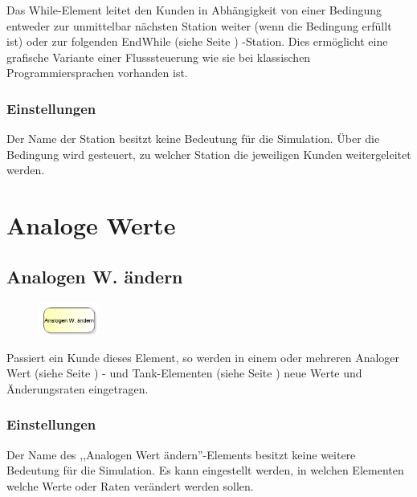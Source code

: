 Das While-Element leitet den Kunden in Abhängigkeit von einer Bedingung entweder
zur unmittelbar nächsten Station weiter (wenn die Bedingung erfüllt ist) oder
zur folgenden EndWhile (siehe Seite \pageref{ref:ModelElementLogicEndWhile}) -Station.
Dies ermöglicht eine grafische Variante einer Flusssteuerung wie sie bei
klassischen Programmiersprachen vorhanden ist.

\subsection*{Einstellungen}

Der Name der Station besitzt keine Bedeutung für die Simulation. Über die Bedingung
wird gesteuert, zu welcher Station die jeweiligen Kunden weitergeleitet werden.





\chapter{Analoge Werte}

\section{Analogen W. ändern}
\label{ref:ModelElementAnalogAssign}

\begin{figure}
\vspace{-22pt}
\includegraphics[width=2cm]{imageModelElementAnalogAssign.png}
\vspace{-22pt}
\end{figure}

Passiert ein Kunde dieses Element, so werden in einem oder mehreren
Analoger Wert (siehe Seite \pageref{ref:ModelElementAnalogValue}) - und
Tank-Elementen (siehe Seite \pageref{ref:ModelElementTank}) 
neue Werte und Änderungsraten eingetragen.

\subsection*{Einstellungen}

Der Name des ,,Analogen Wert ändern''-Elements besitzt keine weitere Bedeutung für die Simulation.
Es kann eingestellt werden, in welchen Elementen welche Werte oder Raten verändert werden sollen.


